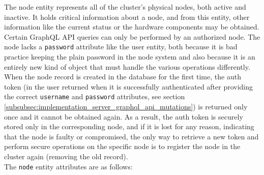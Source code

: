The node entity represents all of the cluster's physical nodes, both active and
inactive. It holds critical information about a node, and from this entity, other
information like the current status or the hardware components may be obtained.
\\ %
Certain GraphQL API queries can only be performed by an authorized node. The
node lacks a \texttt{password} attribute like the user entity, both because it
is bad practice keeping the plain password in the node system and also because
it is an entirely new kind of object that must handle the various operations
differently. When the node record is created in the database for the first time,
the auth token (in the user returned when it is successfully authenticated after
providing the correct \texttt{username} and \texttt{password} attributes, see
section \ref{subsubsec:implementation_server_graphql_api_mutations}) is returned
only once and it cannot be obtained again. As a result, the auth token is securely
stored only in the corresponding node, and if it is lost for any reason, indicating
that the node is faulty or compromised, the only way to retrieve a new token and
perform secure operations on the specific node is to register the node in the
cluster again (removing the old record). \\ %
The \texttt{node} entity attributes are as follows:
